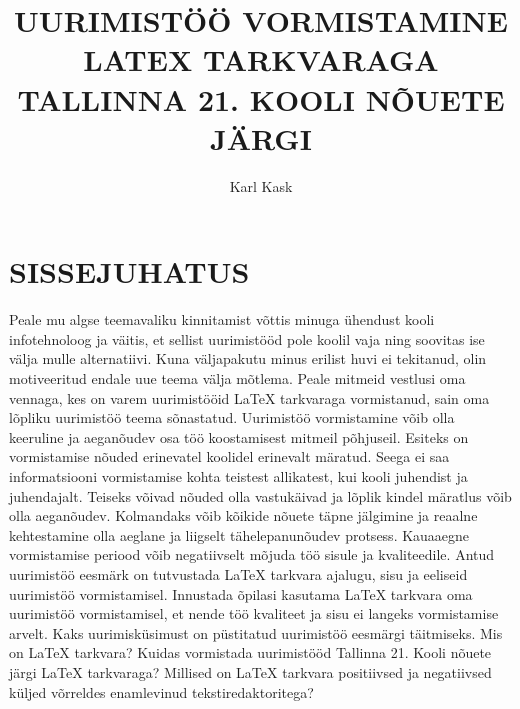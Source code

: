 \documentclass{21kuur}
\title{UURIMIST\"{O}\"{O} VORMISTAMINE LATEX TARKVARAGA TALLINNA 21. KOOLI N\~{O}UETE J\"{A}RGI}
\author{Karl Kask}
\begin{document}
\maketitle
\tableofcontents

\chapter*{SISSEJUHATUS}
Peale mu algse teemavaliku kinnitamist v\~{o}ttis minuga \"{u}hendust kooli infotehnoloog ja v\"{a}itis, et sellist uurimist\"{o}\"{o}d pole koolil vaja ning soovitas ise v\"{a}lja mulle alternatiivi. Kuna v\"{a}ljapakutu minus erilist huvi ei tekitanud, olin motiveeritud endale uue teema v\"{a}lja m\~{o}tlema. Peale mitmeid vestlusi oma vennaga, kes on varem uurimist\"{o}\"{o}id LaTeX tarkvaraga vormistanud, sain oma l\~{o}pliku uurimist\"{o}\"{o} teema s\~{o}nastatud.
Uurimist\"{o}\"{o} vormistamine v\~{o}ib olla keeruline ja aegan\~{o}udev osa t\"{o}\"{o} koostamisest mitmeil p\~{o}hjuseil. Esiteks on vormistamise n\~{o}uded erinevatel koolidel erinevalt m\"{a}ratud. Seega ei saa informatsiooni vormistamise kohta teistest allikatest, kui kooli juhendist ja juhendajalt. Teiseks v\~{o}ivad n\~{o}uded olla vastuk\"{a}ivad ja l\~{o}plik kindel m\"{a}ratlus v\~{o}ib olla aegan\~{o}udev. Kolmandaks v\~{o}ib k\~{o}ikide n\~{o}uete t\"{a}pne j\"{a}lgimine ja reaalne kehtestamine olla aeglane ja liigselt t\"{a}helepanun\~{o}udev protsess. Kauaaegne vormistamise periood v\~{o}ib negatiivselt m\~{o}juda t\"{o}\"{o} sisule ja kvaliteedile.
Antud uurimist\"{o}\"{o} eesm\"{a}rk on tutvustada LaTeX tarkvara ajalugu, sisu ja eeliseid uurimist\"{o}\"{o} vormistamisel. Innustada \~{o}pilasi kasutama LaTeX tarkvara oma uurimist\"{o}\"{o} vormistamisel, et nende t\"{o}\"{o} kvaliteet ja sisu ei langeks vormistamise arvelt. 
Kaks uurimisk\"{u}simust on p\"{u}stitatud uurimist\"{o}\"{o} eesm\"{a}rgi t\"{a}itmiseks. Mis on LaTeX tarkvara? Kuidas vormistada uurimist\"{o}\"{o}d Tallinna 21. Kooli n\~{o}uete j\"{a}rgi LaTeX tarkvaraga? Millised on LaTeX tarkvara positiivsed ja negatiivsed k\"{u}ljed v\~{o}rreldes enamlevinud tekstiredaktoritega?
\end{document}
